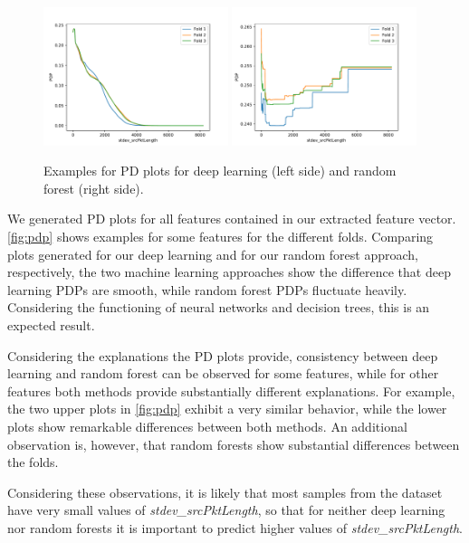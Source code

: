 \documentclass[10pt,sigconf,letterpaper,dvipsnames]{acmart}
\begin{document}
\begin{figure}[h]
\includegraphics[width=0.48\textwidth]{../pdp_CAIA_backdoor_17/apply(stdev(ipTotalLength),forward)_nn.pdf}
\includegraphics[width=0.48\textwidth]{../pdp_CAIA_backdoor_17/apply(stdev(ipTotalLength),forward)_rf.pdf}

\caption{Examples for PD plots for deep learning (left side) and random forest (right side).}
\label{fig:pdp}
\end{figure}

We generated PD plots for all features contained in our extracted feature vector. \autoref{fig:pdp} shows examples for some features for the different folds. Comparing plots generated for our deep learning and for our random forest approach, respectively, the two machine learning approaches show the difference that deep learning PDPs are smooth, while random forest PDPs fluctuate heavily. Considering the functioning of neural networks and decision trees, this is an expected result.

Considering the explanations the PD plots provide, consistency between deep learning and random forest can be observed for some features, while for other features both methods provide substantially different explanations. For example, the two upper plots in \autoref{fig:pdp} exhibit a very similar behavior, while the lower plots show remarkable differences between both methods. An additional observation is, however, that random forests show substantial differences between the folds.

Considering these observations, it is likely that most samples from the dataset have very small values of \textit{stdev\_srcPktLength}, so that for neither deep learning nor random forests it is important to predict higher values of \textit{stdev\_srcPktLength}.
\end{document}

